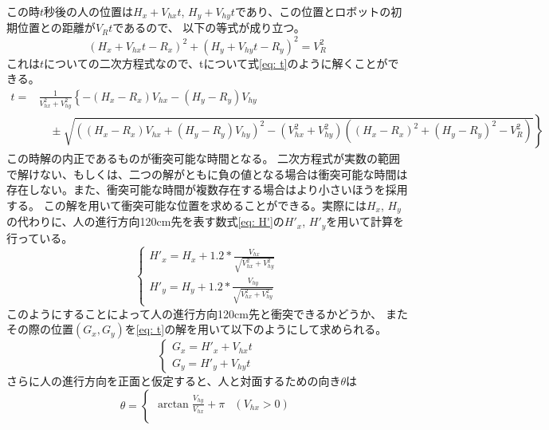 \documentclass{kuisthesis}
\begin{document}
\begin{itemize}
\begin{table}[H]
\end{table}
この時$t$秒後の人の位置は$H_x + V_{hx}t$, $H_y + V_{hy}t$であり、この位置とロボットの初期位置との距離が$V_Rt$であるので、
以下の等式が成り立つ。\begin{equation}(H_x + V_{hx}t - R_x)^{2} + (H_y + V_{hy}t - R_y)^2 = V_R^2\end{equation}
これは$t$についての二次方程式なので、tについて式\ref{eq: t}のように解くことができる。
\begin{equation}
  \label{eq: t}
  \begin{split}
  t = &\frac{1}{V_{hx}^2 + V_{hy}^2}\left\{-(H_x - R_x)V_{hx} - (H_y - R_y)V_{hy}\right. \\
  & \quad \pm \left. \sqrt{((H_x - R_x)V_{hx} + (H_y - R_y)V_{hy})^2 - (V_{hx}^2 + V_{hy}^2)((H_x - R_x)^2 + (H_y - R_y)^2 - V_R^2)}\right\}
  \end{split}
\end{equation}
この時解の内正であるものが衝突可能な時間となる。
二次方程式が実数の範囲で解けない、もしくは、二つの解がともに負の値となる場合は衝突可能な時間は存在しない。また、衝突可能な時間が複数存在する場合はより小さいほうを採用する。
この解を用いて衝突可能な位置を求めることができる。実際には$H_x$, $H_y$の代わりに、人の進行方向120cm先を表す数式\ref{eq: H'}の$H'_x$, $H'_y$を用いて計算を行っている。
\begin{equation}
  \label{eq: H'}
\left\{\begin{array}{l}
H'_x = H_x + 1.2*\frac{V_{hx}}{\sqrt{{V_{hx}^2 + V_{hy}^2}}}\\
H'_y = H_y + 1.2 * \frac{V_{hy}}{\sqrt{V_{hx}^2 + V_{hy}^2}}
\end{array}\right.
\end{equation}
このようにすることによって人の進行方向120cm先と衝突できるかどうか、
またその際の位置$(G_x, G_y)$を\ref{eq: t}の解を用いて以下のようにして求められる。
\begin{equation}
  \label{eq: G}
\left\{\begin{array}{l}
G_x = H'_x + V_{hx}t\\
G_y = H'_y + V_{hy}t
\end{array}\right.
\end{equation}
さらに人の進行方向を正面と仮定すると、人と対面するための向き$\theta$は\\
\begin{equation}
  \label{eq: theta}
  \theta = 
  \begin{cases}
    \arctan{\frac{V_{hy}}{V_{hx}}}  + \pi & (V_{hx} > 0)\\

\end{cases}
\end{equation}
\end{itemize}
\end{document}
